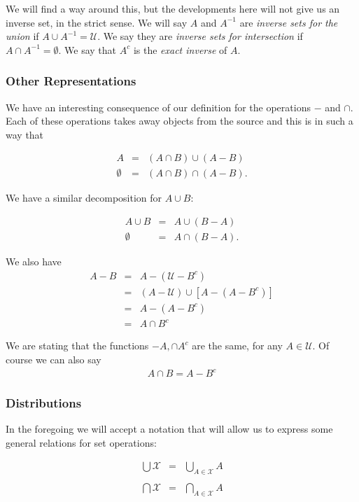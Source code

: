 \documentclass [12pt]{book}
\begin{document}
We will find a way around this, but the developments here will not give us an inverse set, in the strict sense. We will say $A$ and $A^{-1}$ are \textit{inverse sets for the union} if $A\cup A^{-1}=\mathcal{U}$. We say they are \textit{inverse sets for intersection} if $A\cap A^{-1}=\emptyset$. We say that $A^c$ is the \textit{exact inverse} of $A$.

		\subsubsection{Other Representations}

We have an interesting consequence of our definition for the operations $-$ and $\cap$. Each of these operations takes away objects from the source and this is in such a way that

\begin{eqnarray}A&=&(A\cap B)\cup(A-B)\label{decoset1}\\\nonumber\emptyset&=&(A\cap B)\cap(A-B).\end{eqnarray}

We have a similar decomposition for $A\cup B$:

\begin{eqnarray}A\cup B&=&A\cup(B-A)\label{decoset2}\\\nonumber\emptyset&=&A\cap(B-A).\end{eqnarray}

We also have \begin{eqnarray}\nonumber A-B&=&A-(\mathcal{U}-B^c)\\\nonumber&=&(A-\mathcal{U})\cup[A-(A-B^c)]\\\nonumber&=&A-(A-B^c)\\&=&A\cap B^c\end{eqnarray}

We are stating that the functions $-A,\cap A^c$ are the same, for any $A\in\mathcal{U}$. Of course we can also say \begin{eqnarray}\nonumber A\cap B=A-B^c\end{eqnarray}

\subsubsection{Distributions} In the foregoing we will accept a notation that will allow us to express some general relations for set operations:

\begin{eqnarray}\nonumber\bigcup\mathcal{X}&=&\bigcup_{A\in\mathcal{X}}A
\\\nonumber\\\nonumber\bigcap\mathcal{X}&=&\bigcap_{A\in\mathcal{X}}A
\end{eqnarray}
\end{document}
